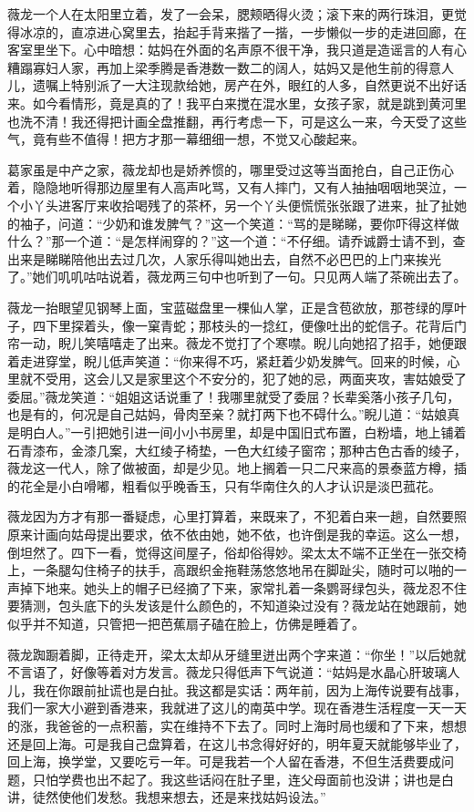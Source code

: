 \par 薇龙一个人在太阳里立着，发了一会呆，腮颊晒得火烫；滚下来的两行珠泪，更觉得冰凉的，直凉进心窝里去，抬起手背来揩了一揩，一步懒似一步的走进回廊，在客室里坐下。心中暗想：姑妈在外面的名声原不很干净，我只道是造谣言的人有心糟蹋寡妇人家，再加上梁季腾是香港数一数二的阔人，姑妈又是他生前的得意人儿，遗嘱上特别派了一大注现款给她，房产在外，眼红的人多，自然更说不出好话来。如今看情形，竟是真的了！我平白来搅在混水里，女孩子家，就是跳到黄河里也洗不清！我还得把计画全盘推翻，再行考虑一下，可是这么一来，今天受了这些气，竟有些不值得！把方才那一幕细细一想，不觉又心酸起来。
\par 葛家虽是中产之家，薇龙却也是娇养惯的，哪里受过这等当面抢白，自己正伤心着，隐隐地听得那边屋里有人高声叱骂，又有人摔门，又有人抽抽咽咽地哭泣，一个小丫头进客厅来收拾喝残了的茶杯，另一个丫头便慌慌张张跟了进来，扯了扯她的袖子，问道：“少奶和谁发脾气？”这一个笑道：“骂的是睇睇，要你吓得这样做什么？”那一个道：“是怎样闹穿的？”这一个道：“不仔细。请乔诚爵士请不到，查出来是睇睇陪他出去过几次，人家乐得叫她出去，自然不必巴巴的上门来挨光了。”她们叽叽咕咕说着，薇龙两三句中也听到了一句。只见两人端了茶碗出去了。
\par 薇龙一抬眼望见钢琴上面，宝蓝磁盘里一棵仙人掌，正是含苞欲放，那苍绿的厚叶子，四下里探着头，像一窠青蛇；那枝头的一捻红，便像吐出的蛇信子。花背后门帘一动，睨儿笑嘻嘻走了出来。薇龙不觉打了个寒噤。睨儿向她招了招手，她便跟着走进穿堂，睨儿低声笑道：“你来得不巧，紧赶着少奶发脾气。回来的时候，心里就不受用，这会儿又是家里这个不安分的，犯了她的忌，两面夹攻，害姑娘受了委屈。”薇龙笑道：“姐姐这话说重了！我哪里就受了委屈？长辈奚落小孩子几句，也是有的，何况是自己姑妈，骨肉至亲？就打两下也不碍什么。”睨儿道：“姑娘真是明白人。”一引把她引进一间小小书房里，却是中国旧式布置，白粉墙，地上铺着石青漆布，金漆几案，大红绫子椅垫，一色大红绫子窗帘；那种古色古香的绫子，薇龙这一代人，除了做被面，却是少见。地上搁着一只二尺来高的景泰蓝方樽，插的花全是小白嗗嘟，粗看似乎晚香玉，只有华南住久的人才认识是淡巴菰花。
\par 薇龙因为方才有那一番疑虑，心里打算着，来既来了，不犯着白来一趟，自然要照原来计画向姑母提出要求，依不依由她，她不依，也许倒是我的幸运。这么一想，倒坦然了。四下一看，觉得这间屋子，俗却俗得妙。梁太太不端不正坐在一张交椅上，一条腿勾住椅子的扶手，高跟织金拖鞋荡悠悠地吊在脚趾尖，随时可以啪的一声掉下地来。她头上的帽子已经摘了下来，家常扎着一条鹦哥绿包头，薇龙忍不住要猜测，包头底下的头发该是什么颜色的，不知道染过没有？薇龙站在她跟前，她似乎并不知道，只管把一把芭蕉扇子磕在脸上，仿佛是睡着了。
\par 薇龙踟蹰着脚，正待走开，梁太太却从牙缝里迸出两个字来道：“你坐！”以后她就不言语了，好像等着对方发言。薇龙只得低声下气说道：“姑妈是水晶心肝玻璃人儿，我在你跟前扯谎也是白扯。我这都是实话：两年前，因为上海传说要有战事，我们一家大小避到香港来，我就进了这儿的南英中学。现在香港生活程度一天一天的涨，我爸爸的一点积蓄，实在维持不下去了。同时上海时局也缓和了下来，想想还是回上海。可是我自己盘算着，在这儿书念得好好的，明年夏天就能够毕业了，回上海，换学堂，又要吃亏一年。可是我若一个人留在香港，不但生活费要成问题，只怕学费也出不起了。我这些话闷在肚子里，连父母面前也没讲；讲也是白讲，徒然使他们发愁。我想来想去，还是来找姑妈设法。”
